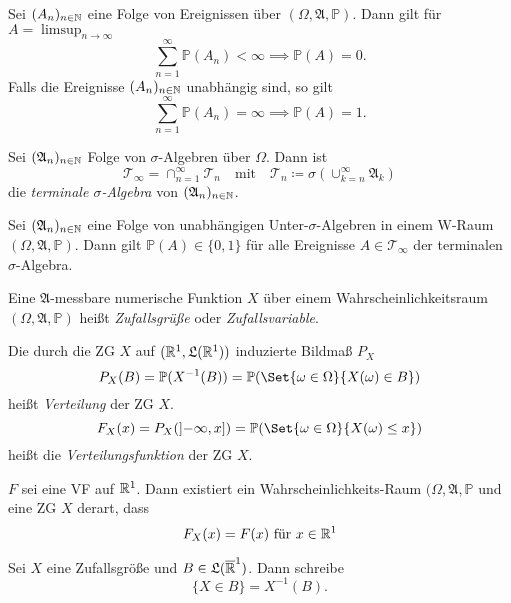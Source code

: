 \documentclass{cheat-sheet}
\newcommand{\Alg}{\mathfrak{A}}
\newcommand{\LebAlg}{\mathfrak{L}} %
\renewcommand{\P}{\mathbb{P}}
\begin{document}
\begin{lem}
  Sei $(A_n)_{n \in \mathbb{N}}$ eine Folge von Ereignissen über $(\Omega, \Alg, \P)$. Dann gilt für $A = \limsup_{n \to \infty}$
  \[ \sum_{n=1}^\infty \P(A_n) < \infty \implies \P(A) = 0. \]
  Falls die Ereignisse $(A_n)_{n \in \mathbb{N}}$ unabhängig sind, so gilt
  \[ \sum_{n=1}^\infty \P(A_n) = \infty \implies \P(A) = 1. \]
\end{lem}

\begin{defn}
  Sei $(\Alg_n)_{n \in \N}$ Folge von $\sigma$-Algebren über $\Omega$. Dann ist
  \[ \mathcal{T}_\infty = \cap_{n=1}^\infty \mathcal{T}_n \quad \text{mit} \quad \mathcal{T}_n \coloneqq \sigma \left( \cup_{k=n}^\infty \Alg_k \right) \]
  die \emph{terminale $\sigma$-Algebra} von $(\Alg_n)_{n \in \N}$.
\end{defn}


\begin{satz}
  Sei $(\Alg_n)_{n \in \N}$ eine Folge von unabhängigen Unter-$\sigma$-Algebren in einem W-Raum $(\Omega, \Alg, \P)$. Dann gilt $\P(A) \in \{ 0, 1 \}$ für alle Ereignisse $A \in \mathcal{T}_\infty$ der terminalen $\sigma$-Algebra.
\end{satz}

\begin{defn}
  Eine $\Alg$-messbare numerische Funktion $X$ über einem Wahrscheinlichkeitsraum $(\Omega, \Alg, \P)$ heißt \emph{Zufallsgrüße} oder \emph{Zufallsvariable}.
\end{defn}

\begin{defn}
  Die durch die ZG $X$ auf $(\R^1, \LebAlg(\R^1))$ induzierte Bildmaß $P_X$
  \[ P_X(B) = \P(X^{-1}(B)) = \P(\Set{ \omega \in \Omega  }{ X(\omega) \in B }) \]
  heißt \emph{Verteilung} der ZG $X$.
  \[ F_X(x) = P_X(\left]-\infty, x\right]) = \P(\Set{ \omega \in \Omega }{ X(\omega) \leq x }) \]
  heißt die \emph{Verteilungsfunktion} der ZG $X$.
\end{defn}

\begin{satz}
  $F$ sei eine VF auf $\mathbb{R}^1$. Dann existiert ein Wahrscheinlichkeits-Raum $(\Omega, \Alg, \P$ und eine ZG $X$ derart, dass
  \[ F_X(x) = F(x) \text{ für } x \in \mathbb{R}^1 \]
\end{satz}

\begin{nota}
  Sei $X$ eine Zufallsgröße und $B \in \LebAlg(\overline{\R}^1)$. Dann schreibe
  \[ \{ X \in B \} = X^{-1}(B). \]
\end{nota}
\end{document}
